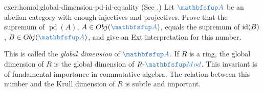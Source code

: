 \begin{exer}{}{exer:homol:global-dimension-pd-id-equality}
  (See
  .)
  Let $\categ{A}$ be an abelian category with enough injectives and
  projectives. Prove that the supremum of $\operatorname{pd}(A)$,
  $A \in \Obj(\categ{A})$, equals the supremum of $\operatorname{id}(B)$,
  $B \in \Obj(\categ{A})$, and give an Ext interpretation for this
  number.

  This is called the \emph{global dimension} of $\categ{A}$. If $R$ is
  a ring, the global dimension of $R$ is the global dimension of
  $R\text{-}\categ{Mod}$. This invariant is of fundamental importance
  in commutative algebra. The relation between this number and the
  Krull dimension of $R$ is subtle and important.
\end{exer}
